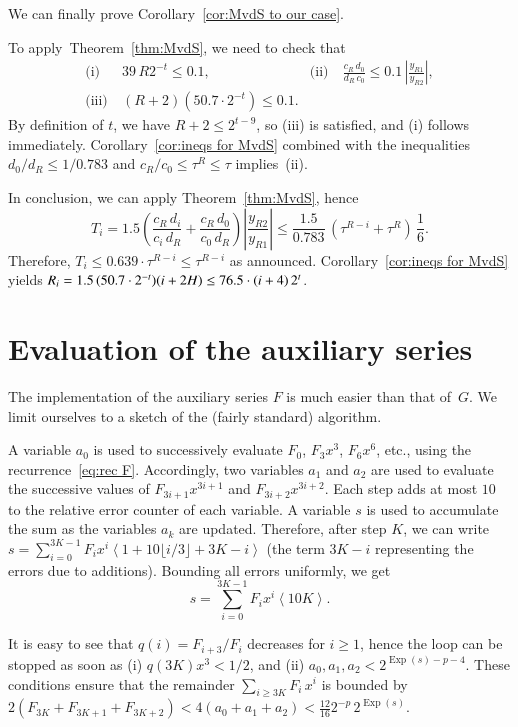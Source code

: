 \documentclass[10pt, conference]{IEEEtran}
\DeclareMathOperator{\EXP}{Exp}
\newcommand{\ttarget}{p}
\newcommand{\twork}{t}
\newcommand{\rnd}[1]{\left\langle #1 \right\rangle}
\begin{document}
We can finally prove Corollary~\ref{cor:MvdS to our case}.
\begin{IEEEproof}
    To apply~Theorem~\ref{thm:MvdS}, we need to check that
    \begin{align*}
      \text{(i)}~ & 39\,R 2^{-\twork} \le 0.1,
      &\text{(ii)}~ & \frac{c_R\,d_0}{d_R\,c_0} \le 0.1\,\left|\frac{y_{R1}}{y_{R2}}\right|, \\
      \text{(iii)}~&(R+2)(50.7\cdot 2^{-\twork})\le 0.1.
    \end{align*}
    By definition of $\twork$, we have $R+2 \le 2^{\twork-9}$, so (iii) is satisfied, and (i) follows immediately.
    Corollary~\ref{cor:ineqs for MvdS} combined with the inequalities $d_0/d_R \le 1/0.783$ and $c_R/c_0 \le \tau^R \le \tau$ implies~(ii).

In conclusion, we can apply Theorem~\ref{thm:MvdS}, hence 
\[ T_i = 1.5
\left(\frac{c_R\,d_i}{c_i\,d_R} + \frac{c_R\,d_0}{c_0\,d_R}\right)
\left|\frac{y_{R2}}{y_{R1}}\right| \le \frac{1.5}{0.783}\,\left(\tau^{R-i} +
\tau^{R}\right)\,\frac{1}{6}. \] Therefore, $T_i \le 0.639 \cdot \tau^{R-i} \le \tau^{R-i}$ as announced.
Corollary~\ref{cor:ineqs for MvdS} yields $R_i = 1.5 \, (50.7\cdot 2^{-\twork}) (i+2H) \le 76.5\cdot (i+4)\,2^{\-\twork}$.
\end{IEEEproof}

\section{Evaluation of the auxiliary series}
\label{sec:evaluation of F}

The implementation of the auxiliary series $F$ is much easier than that of~$G$.
We limit ourselves to a sketch of the (fairly standard) algorithm.

A variable $a_0$ is used to successively evaluate $F_0$, $F_3 x^3$, $F_6 x^6$, etc., using the recurrence~\eqref{eq:rec F}. Accordingly, two variables $a_1$ and $a_2$ are used to evaluate the successive values of $F_{3i+1} x^{3i+1}$ and $F_{3i+2} x^{3i+2}$. Each step adds at most $10$ to the relative error counter of each variable. A variable $s$ is used to accumulate the sum as the variables $a_k$ are updated. Therefore, after step $K$, we can write $s = \sum_{i=0}^{3K-1} F_i x^i \rnd{1+10\lfloor i/3 \rfloor+3K-i}$ (the term $3K-i$ representing the errors due to additions). Bounding all errors uniformly, we get
\[ s = \sum_{i=0}^{3K-1} F_i x^i \rnd{10K}. \]

It is easy to see that $q(i) = F_{i+3}/F_i$ decreases for $i\ge
1$, hence the loop can be stopped as soon as (i) $q(3K) x^3 < 1/2$, and (ii)
$a_0, a_1, a_2 < 2^{\EXP(s)-\ttarget-4}$. These conditions ensure that the
remainder $\sum_{i\ge 3K} F_i\,x^{i}$ is bounded by $2(F_{3K} + F_{3K+1} + F_{3K+2}) < 4(a_0+a_1+a_2) < \frac{12}{16} 2^{-\ttarget}\,2^{\EXP(s)}$.
\end{document}
